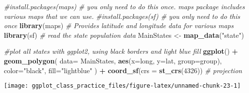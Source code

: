 \documentclass[
]{article}
\newenvironment{Shaded}{\begin{snugshade}}{\end{snugshade}}
\newcommand{\AttributeTok}[1]{\textcolor[rgb]{0.13,0.29,0.53}{#1}}
\newcommand{\CommentTok}[1]{\textcolor[rgb]{0.56,0.35,0.01}{\textit{#1}}}
\newcommand{\DecValTok}[1]{\textcolor[rgb]{0.00,0.00,0.81}{#1}}
\newcommand{\FunctionTok}[1]{\textcolor[rgb]{0.13,0.29,0.53}{\textbf{#1}}}
\newcommand{\NormalTok}[1]{#1}
\newcommand{\OtherTok}[1]{\textcolor[rgb]{0.56,0.35,0.01}{#1}}
\newcommand{\SpecialCharTok}[1]{\textcolor[rgb]{0.81,0.36,0.00}{\textbf{#1}}}
\newcommand{\StringTok}[1]{\textcolor[rgb]{0.31,0.60,0.02}{#1}}
\begin{document}
\begin{Shaded}
\begin{Highlighting}[]
\CommentTok{\#install.packages(\textquotesingle{}maps\textquotesingle{}) \# you only need to do this once. maps package includes various maps that we can use.}
\CommentTok{\#install.packages(\textquotesingle{}sf\textquotesingle{}) \# you only need to do this once}
\FunctionTok{library}\NormalTok{(maps)     }\CommentTok{\# Provides latitude and longitude data for various maps}
\FunctionTok{library}\NormalTok{(sf)}
\CommentTok{\# read the state population data}
\NormalTok{MainStates }\OtherTok{\textless{}{-}} \FunctionTok{map\_data}\NormalTok{(}\StringTok{"state"}\NormalTok{)}

\CommentTok{\#plot all states with ggplot2, using black borders and light blue fill}
\FunctionTok{ggplot}\NormalTok{() }\SpecialCharTok{+} 
  \FunctionTok{geom\_polygon}\NormalTok{( }\AttributeTok{data=}\NormalTok{ MainStates, }\FunctionTok{aes}\NormalTok{(}\AttributeTok{x=}\NormalTok{long, }\AttributeTok{y=}\NormalTok{lat, }\AttributeTok{group=}\NormalTok{group),}
                \AttributeTok{color=}\StringTok{"black"}\NormalTok{, }\AttributeTok{fill=}\StringTok{"lightblue"}\NormalTok{ ) }\SpecialCharTok{+}
                \FunctionTok{coord\_sf}\NormalTok{(}\AttributeTok{crs =} \FunctionTok{st\_crs}\NormalTok{(}\DecValTok{4326}\NormalTok{)) }\CommentTok{\# projection}
\end{Highlighting}
\end{Shaded}

\begin{center}\texttt{[image: ggplot\_class\_practice\_files/figure-latex/unnamed-chunk-23-1]} \end{center}
\end{document}
